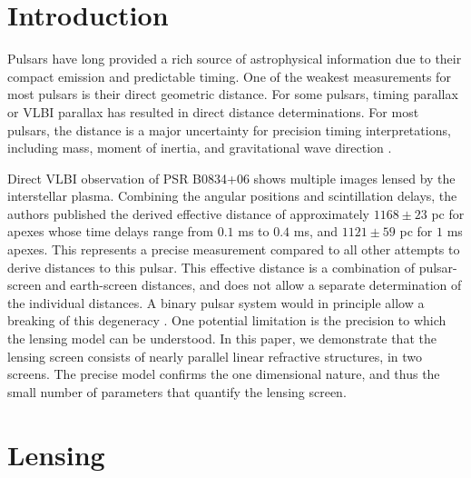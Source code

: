 \documentclass[useAMS,usenatbib]{mn2e}
\begin{document}
\newcommand{\be}{\begin{eqnarray}}
\newcommand{\ee}{\end{eqnarray}}
\newcommand{\beq}{\begin{equation}}
\newcommand{\eeq}{\end{equation}}

\section{Introduction}

Pulsars have long provided a rich source of astrophysical information
due to their compact emission and predictable timing. One of the
weakest measurements for most pulsars is their direct geometric
distance.  For some pulsars, timing parallax or VLBI parallax has
resulted in direct distance determinations.  For most pulsars, the
distance is a major uncertainty for precision timing interpretations,
including mass, moment of inertia, and gravitational wave
direction \citep{boyle2012}.

Direct VLBI observation of PSR B0834+06 shows multiple images lensed
by the interstellar plasma.  Combining the angular positions and
scintillation delays, the authors published the derived effective
distance \citep{2010ApJ...708..232B} of approximately $1168\pm 23$ pc
for apexes whose time delays range from $0.1$ ms to $0.4$ ms, and
$1121\pm 59$ pc for $1$ ms apexes.  This represents a precise
measurement compared to all other attempts to derive distances to this
pulsar.  This effective distance is a combination of pulsar-screen and
earth-screen distances, and does not allow a separate determination of
the individual distances.  A binary pulsar system would in principle
allow a breaking of this degeneracy \citep{2014MNRAS.442.3338P}. One
potential limitation is the precision to which the lensing model can
be understood.  In this paper, we demonstrate that the lensing screen
consists of nearly parallel linear refractive structures, in two
screens.  The precise model confirms the one dimensional nature, and
thus the small number of parameters that
quantify the lensing screen. 

\section{Lensing}
\end{document}
